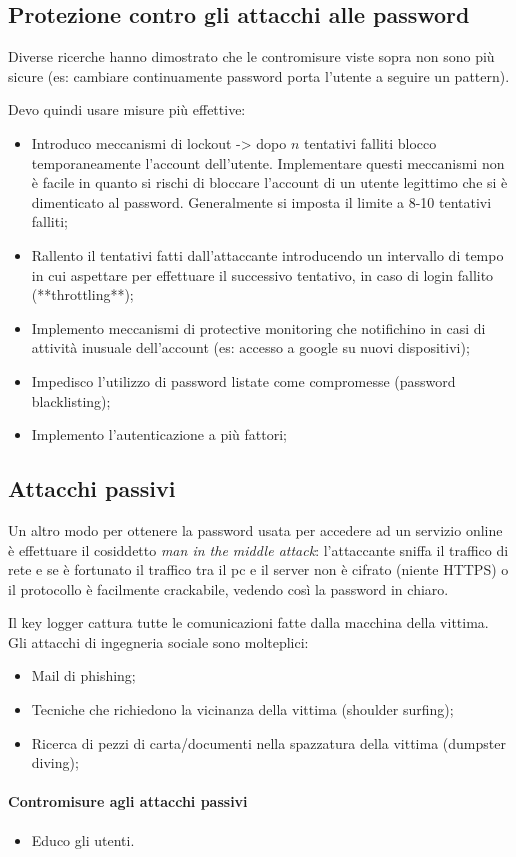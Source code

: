 \subsection{Protezione contro gli attacchi alle password}

Diverse ricerche hanno dimostrato che le contromisure viste sopra non sono più sicure (es: cambiare continuamente password porta l'utente a seguire un pattern). 

\noindent Devo quindi usare misure più effettive:
\begin{itemize}
    \item Introduco meccanismi di lockout -> dopo $n$ tentativi falliti blocco temporaneamente l'account dell'utente. Implementare questi meccanismi non è facile in quanto si rischi di bloccare l'account di un utente legittimo che si è dimenticato al password. Generalmente si imposta il limite a 8-10 tentativi falliti;
    \item Rallento il tentativi fatti dall'attaccante introducendo un intervallo di tempo in cui aspettare per effettuare il successivo tentativo, in caso di login fallito (**throttling**);
    \item Implemento meccanismi di protective monitoring che notifichino in casi di attività inusuale dell'account (es: accesso a google su nuovi dispositivi);
    \item Impedisco l'utilizzo di password listate come compromesse (password blacklisting);
    \item Implemento l'autenticazione a più fattori;
\end{itemize}

\subsection{Attacchi passivi}
Un altro modo per ottenere la password usata per accedere ad un servizio online è effettuare il cosiddetto \textit{man in the middle attack}: l'attaccante sniffa il traffico di rete e se è fortunato il traffico tra il pc e il server non è cifrato (niente HTTPS) o il protocollo è facilmente crackabile, vedendo così la password in chiaro. 

Il key logger cattura tutte le comunicazioni fatte dalla macchina della vittima.
\\

\noindent Gli attacchi di ingegneria sociale sono molteplici:
\begin{itemize}
    \item Mail di phishing;
    \item Tecniche che richiedono la vicinanza della vittima (shoulder surfing);
    \item Ricerca di pezzi di carta/documenti nella spazzatura della vittima (dumpster diving);
\end{itemize}

\paragraph{Contromisure agli attacchi passivi}
\begin{itemize}
    \item Educo gli utenti.
\end{itemize}



